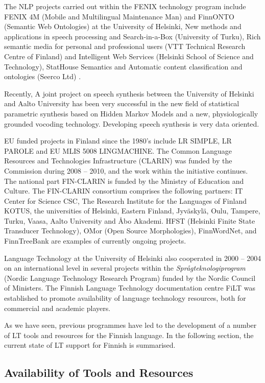 \documentclass[]{../../metanetpaper}
\begin{document}
\begin{multicols}{2}
The NLP projects carried out within the FENIX technology program include FENIX
4M (Mobile and Multilingual Maintenance Man) and FinnONTO (Semantic Web
Ontologies) at the University of Helsinki, New methods and applications in
speech processing and Search-in-a-Box (University of Turku), Rich semantic
media for personal and professional users (VTT Technical Research Centre of
Finland) and Intelligent Web Services (Helsinki School of Science and
Technology), StatHouse Semantics and Automatic content classification and
ontologies (Seerco Ltd) \cite{FinalFENIX}.

Recently, A joint project on speech synthesis between the University of
Helsinki and Aalto University has been very successful in the new field of
statistical parametric synthesis based on Hidden Markov Models and a new,
physiologically grounded vocoding technology. Developing speech synthesis is
very data oriented.

EU funded projects in Finland since the 1980’s include LR SIMPLE, LR
PAROLE and EU MLIS 5008 LINGMACHINE.  The Common Language Resources
and Technologies Infrastructure (CLARIN) was funded by the Commission
during 2008 – 2010, and the work within the initiative continues. The
national part FIN-CLARIN is funded by the Ministry of Education and
Culture. The FIN-CLARIN consortium comprises the following partners:
IT Center for Science CSC, The Research Institute for the Languages of
Finland KOTUS, the universities of Helsinki, Eastern Finland,
Jyväskylä, Oulu, Tampere, Turku, Vaasa, Aalto University and Åbo
Akademi. HFST (Helsinki Finite State Transducer Technology), OMor
(Open Source Morphologies), FinnWordNet, and FinnTreeBank are examples
of currently ongoing projects.

Language Technology at the University of Helsinki also cooperated in 2000 –
2004 on an international level in several projects within the
\textit{Språgteknologiprogram} (Nordic Language Technology Research Program)
funded by
the Nordic Council of Ministers. The Finnish Language Technology documentation
centre FiLT was established to promote availability of language technology
resources, both for commercial and academic players.

As we have seen, previous programmes have led to the development of a number of
LT tools and resources for the Finnish language. In the following section, the
current state of LT support for Finnish is summarised.

\subsection{Availability of Tools and Resources}




\end{multicols}
\end{document}
